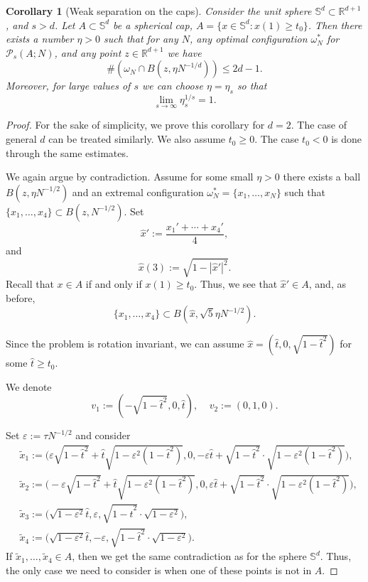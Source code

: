 \documentclass[12pt]{amsart}
\newtheorem{corollary}[theorem]{Corollary}
\theoremstyle{definition}
\def\R{\mathbb{R}}
\def\ep{\varepsilon}
\newcommand{\1}{\mathbf{1}}
\newcommand{\PP}{\mathcal{P}}
\renewcommand\S{\mathbb{S}}
\begin{document}
\begin{corollary}[Weak separation on the caps] \label{weakseparspherecaps}
Consider the unit sphere $\S^d\subset \R^{d+1}$, and $s>d$. Let $A\subset \S^d$ be a spherical cap, $A=\{x\in \S^d\colon x(1)\geqslant t_0\}$. Then there exists a number $\eta>0$ such that for any $N$, any optimal configuration $\omega^*_N$ for $\PP_s(A; N)$, and any point $z\in \R^{d+1}$ we have
$$
\#(\omega_N \cap B(z, \eta N^{-1/d}))\leqslant 2d-1.
$$
Moreover, for large values of $s$ we can choose $\eta=\eta_s$ so that
$$
\lim_{s\to \infty} \eta_s^{1/s} =1.
$$
\end{corollary}
\begin{proof}
For the sake of simplicity, we prove this corollary for $d=2$. The case of general $d$ can be treated similarly. We also assume $t_0\geqslant 0$. The case $t_0<0$ is done through the same estimates.

We again argue by contradiction. Assume for some small $\eta>0$ there exists a ball $B(z, \eta N^{-1/2})$ and an extremal configuration $\omega^*_N=\{x_1, \ldots, x_N\}$ such that $\{x_1, \ldots, x_{4}\}\subset B(z, N^{-1/2})$. Set
$$
\hat{x}':=\frac{x_1'+\cdots+x_{4}'}{4},
$$
and 
$$
\hat{x}(3):=\sqrt{1-|\hat{x}'|^2}.
$$
Recall that $x\in A$ if and only if $x(1)\geqslant t_0$. Thus, we see that $\hat{x}'\in A$, and, as before,
$$
\{x_1, \ldots, x_{4}\}\subset B(\hat{x}, \sqrt{5}\eta N^{-1/2}).
$$

Since the problem is rotation invariant, we can assume $\hat{x}=(\hat{t}, 0, \sqrt{1-\hat{t}^2})$ for some $\hat{t}\geqslant t_0$.

We denote
$$
v_1:=(-\sqrt{1-\hat t^2}, 0, \hat t), \;\;\;\; v_2:=(0,1,0).
$$

Set $\ep:=\tau N^{-1/2}$ and consider
\begin{align*}
&\tilde{x}_1:=\Big(\ep \sqrt{1-\hat{t}^2}+\hat{t}\sqrt{1-\ep^2(1-\hat{t}^2)}, 0, -\ep \hat{t}+\sqrt{1-\hat{t}^2}\cdot\sqrt{1-\ep^2(1-\hat{t}^2)}\Big), \\
&\tilde{x}_2:=\Big(-\ep \sqrt{1-\hat{t}^2}+\hat{t}\sqrt{1-\ep^2(1-\hat{t}^2)}, 0, \ep \hat{t}+\sqrt{1-\hat{t}^2}\cdot\sqrt{1-\ep^2(1-\hat{t}^2)}\Big),\\
& \tilde{x}_3:=\Big(\sqrt{1-\ep^2}\hat{t}, \ep, \sqrt{1-\hat{t}^2}\cdot \sqrt{1-\ep^2}\Big), \\
&\tilde{x}_4:=\Big(\sqrt{1-\ep^2}\hat{t}, -\ep, \sqrt{1-\hat{t}^2}\cdot \sqrt{1-\ep^2}\Big).
\end{align*}
If $\tilde{x}_1, \ldots, \tilde{x}_4\in A$, then we get the same contradiction as for the sphere $\mathbb{S}^d$. Thus, the only case we need to consider is when one of these points is not in $A$. 


\end{proof}
\end{document}
